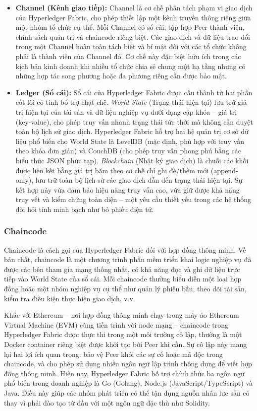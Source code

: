 \begin{itemize}
    \item \textbf{Channel (Kênh giao tiếp):} Channel là cơ chế phân tách phạm vi giao dịch của Hyperledger Fabric, cho phép thiết lập một kênh truyền thông riêng giữa một nhóm tổ chức cụ thể. Mỗi Channel có sổ cái, tập hợp Peer thành viên, chính sách quản trị và chaincode riêng biệt. Các giao dịch và dữ liệu trao đổi trong một Channel hoàn toàn tách biệt và bí mật đối với các tổ chức không phải là thành viên của Channel đó. Cơ chế này đặc biệt hữu ích trong các kịch bản kinh doanh khi nhiều tổ chức chia sẻ chung một hạ tầng nhưng có những hợp tác song phương hoặc đa phương riêng cần được bảo mật.

    \item \textbf{Ledger (Sổ cái):} Sổ cái của Hyperledger Fabric được cấu thành từ hai phần cốt lõi có tính bổ trợ chặt chẽ. \textit{World State} (Trạng thái hiện tại) lưu trữ giá trị hiện tại của tài sản và dữ liệu nghiệp vụ dưới dạng cặp khóa -- giá trị (key-value), cho phép truy vấn nhanh trạng thái tức thời mà không cần duyệt toàn bộ lịch sử giao dịch. Hyperledger Fabric hỗ trợ hai hệ quản trị cơ sở dữ liệu phổ biến cho World State là LevelDB (mặc định, phù hợp với truy vấn theo khóa đơn giản) và CouchDB (cho phép truy vấn phong phú bằng các biểu thức JSON phức tạp). \textit{Blockchain} (Nhật ký giao dịch) là chuỗi các khối được liên kết bằng giá trị băm theo cơ chế chỉ ghi đè/thêm mới (append-only), lưu trữ toàn bộ lịch sử các giao dịch dẫn đến trạng thái hiện tại. Sự kết hợp này vừa đảm bảo hiệu năng truy vấn cao, vừa giữ được khả năng truy vết và kiểm chứng toàn diện -- một yêu cầu thiết yếu trong các hệ thống đòi hỏi tính minh bạch như bỏ phiếu điện tử.
\end{itemize}

\subsubsection{Chaincode}

Chaincode là cách gọi của Hyperledger Fabric đối với hợp đồng thông minh. Về bản chất, chaincode là một chương trình phần mềm triển khai logic nghiệp vụ đã được các bên tham gia mạng thống nhất, có khả năng đọc và ghi dữ liệu trực tiếp vào World State của sổ cái. Mỗi chaincode thường biểu diễn một loại hợp đồng hoặc một nhóm nghiệp vụ cụ thể như quản lý phiếu bầu, theo dõi tài sản, kiểm tra điều kiện thực hiện giao dịch, v.v.

Khác với Ethereum -- nơi hợp đồng thông minh chạy trong máy ảo Ethereum Virtual Machine (EVM) cùng tiến trình với node mạng -- chaincode trong Hyperledger Fabric được thực thi trong một môi trường cô lập, thường là một Docker container riêng biệt được khởi tạo bởi Peer khi cần. Sự cô lập này mang lại hai lợi ích quan trọng: bảo vệ Peer khỏi các sự cố hoặc mã độc trong chaincode, và cho phép sử dụng nhiều ngôn ngữ lập trình thông dụng để viết hợp đồng thông minh. Hiện nay, Hyperledger Fabric hỗ trợ chính thức ba ngôn ngữ phổ biến trong doanh nghiệp là Go (Golang), Node.js (JavaScript/TypeScript) và Java. Điều này giúp các nhóm phát triển có thể tận dụng nguồn nhân lực sẵn có thay vì phải đào tạo từ đầu với một ngôn ngữ đặc thù như Solidity.

